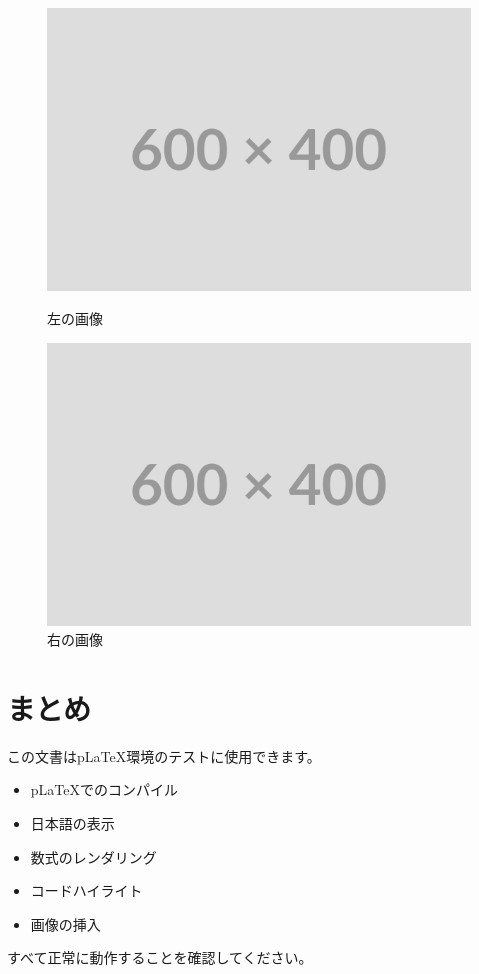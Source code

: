 \documentclass[12pt,a4paper,dvipdfmx]{jarticle}
\begin{document}
\begin{figure}[htbp]
  \centering
  \begin{minipage}{0.45\textwidth}
    \centering
    \includegraphics[width=\textwidth]{images/placeholder.png}
    \caption{左の画像}
    \label{fig:left}
  \end{minipage}
  \hfill
  \begin{minipage}{0.45\textwidth}
    \centering
    \includegraphics[width=\textwidth]{images/placeholder.png}
    \caption{右の画像}
    \label{fig:right}
  \end{minipage}
\end{figure}

\section{まとめ}

この文書はpLaTeX環境のテストに使用できます。
\begin{itemize}
  \item pLaTeXでのコンパイル
  \item 日本語の表示
  \item 数式のレンダリング
  \item コードハイライト
  \item 画像の挿入
\end{itemize}

すべて正常に動作することを確認してください。
\end{document}

